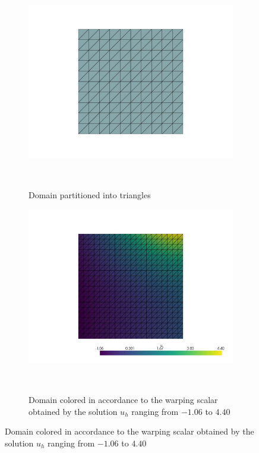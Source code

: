 \begin{figure}[H]
    \centering
    \begin{subfigure}{.49\textwidth}
        \centering
        \includegraphics[width=\textwidth]{Afsnit/Application/figurer/screenshot_1.jpeg}
        \caption{Domain partitioned into triangles}~\label{fig:FEM_plot_domain}
      \end{subfigure}
    \begin{subfigure}{.49\textwidth}
        \centering
        \includegraphics[width=\textwidth]{Afsnit/Application/figurer/screenshot_2.jpeg}
        \caption{Domain colored in accordance to the warping scalar obtained by the solution $u_h$ ranging from $-1.06$ to $4.40$}~\label{fig:FEM_plot_warped_domain}

\end{subfigure}
\end{figure}

